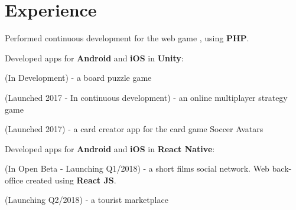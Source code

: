 \documentclass[a4paper]{deedy-resume} %
\begin{document}
\hfill
%
%
\begin{minipage}[t]{0.64\textwidth} %

\section{Experience}
\begin{tightitemize}
    \vspace{\topsep}
    \item Performed continuous development for the web game  , using \textbf{PHP}.
    \item Developed apps for \textbf{Android} and \textbf{iOS} in \textbf{Unity}:
    \begin{innertightitemize}
        \item {} (In Development) - a board puzzle game
        \item {} (Launched 2017 - In continuous development) - an online multiplayer strategy game
        \item {} (Launched 2017) - a card creator app for the card game Soccer Avatars
    \end{innertightitemize}
    \item Developed apps for \textbf{Android} and \textbf{iOS} in \textbf{React Native}:
    \begin{innertightitemize}
        \item {} (In Open Beta - Launching Q1/2018) - a short films social network.
              Web back-office created using \textbf{React JS}.
        \item {} (Launching Q2/2018) - a tourist marketplace
    \end{innertightitemize}
\end{tightitemize}


\end{minipage}
\end{document}
